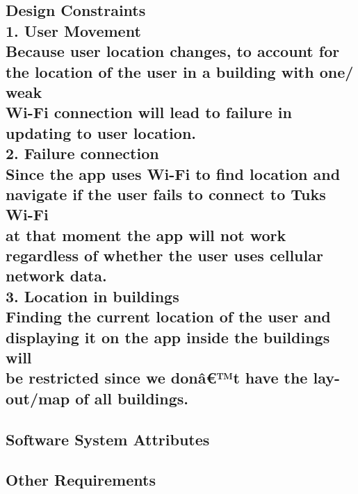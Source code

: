\documentclass[a4paper,10pt]{article}
\begin{document}
	\subsection{Design Constraints		\\
		1. User Movement		\\
			Because user location changes, to account for the location of the user in a building with one/ weak  \\
			Wi-Fi connection will lead to failure in updating to user location.		\\
		2. Failure connection		\\
			Since the app uses Wi-Fi to find location and navigate if the user fails to connect to Tuks Wi-Fi \\
			at that moment the app will not work regardless of whether the user uses cellular network data.		\\
		3. Location in buildings 	\\
			Finding the current location of the user and displaying it on the app inside the buildings will \\
			be restricted since we donâ€™t have the lay-out/map of all buildings.	\\
			
	}
	\subsection{Software System Attributes}
	\subsection{Other Requirements}
\end{document}
